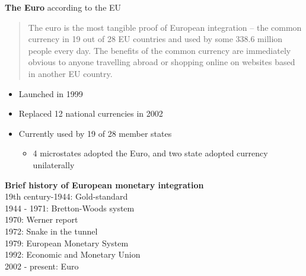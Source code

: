\documentclass{beamer}
\begin{document}
\begin{frame}
  \textbf{The Euro} according to the EU
  \begin{quote}
    The euro is the most tangible proof of European integration – the common currency in 19 out of 28 EU countries and used by some 338.6 million people every day. The benefits of the common currency are immediately obvious to anyone travelling abroad or shopping online on websites based in another EU country.
  \end{quote}
  \medskip
  \begin{itemize}
    \item Launched in 1999
    \item Replaced 12 national currencies in 2002
    \item Currently used by 19 of 28 member states
    \begin{itemize}
      \item 4 microstates adopted the Euro, and two state adopted currency unilaterally
    \end{itemize}
  \end{itemize}
\end{frame}

\begin{frame}
  \textbf{Brief history of European monetary integration}\\
  \medskip
  19th century-1944: Gold-standard \\
  1944 - 1971: Bretton-Woods system\\
  1970: Werner report\\
  1972: Snake in the tunnel\\
  1979: European Monetary System\\
  1992: Economic and Monetary Union\\
  2002 - present: Euro  
\end{frame}

\begin{frame}

\end{frame}
\end{document}
